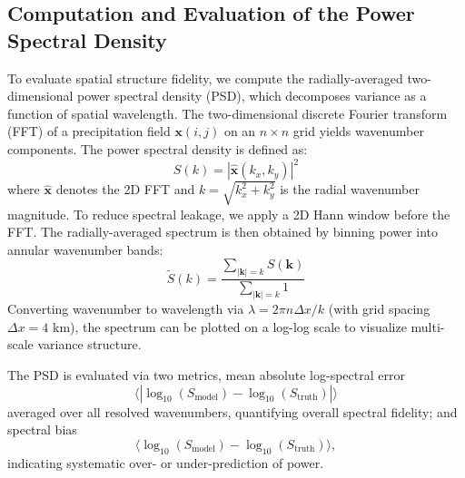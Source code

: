 \documentclass[11pt]{article}
\begin{document}
\subsection{Computation and Evaluation of the Power Spectral Density}
To evaluate spatial structure fidelity, we compute the radially-averaged two-dimensional power spectral density (PSD), which decomposes variance as a function of spatial wavelength.  The two-dimensional discrete Fourier transform (FFT) of a precipitation field $\mathbf{x}(i, j)$ on an $n \times n$ grid yields wavenumber components. The power spectral density is defined as:
$$S(k) = \left|\hat{\mathbf{x}}(k_x, k_y)\right|^2$$
where $\hat{\mathbf{x}}$ denotes the 2D FFT and $k = \sqrt{k_x^2 + k_y^2}$ is the radial wavenumber magnitude. To reduce spectral leakage, we apply a 2D Hann window before the FFT. The radially-averaged spectrum is then obtained by binning power into annular wavenumber bands:
$$
\tilde{S}(k) = \frac{\sum_{|\mathbf{k}| = k} S(\mathbf{k})}{\sum_{|\mathbf{k}| = k} 1}
$$
Converting wavenumber to wavelength via $\lambda = 2\pi n \Delta x / k$ (with grid spacing $\Delta x = 4$ km), the spectrum can be plotted on a log-log scale to visualize multi-scale variance structure.

The PSD is evaluated via two metrics, mean absolute log-spectral error
$$
\langle |\log_{10}(S_{\text{model}}) - \log_{10}(S_{\text{truth}})| \rangle$$
averaged over all resolved wavenumbers, quantifying overall spectral fidelity; and spectral bias
$$\langle \log_{10}(S_{\text{model}}) - \log_{10}(S_{\text{truth}}) \rangle,$$
indicating systematic over- or under-prediction of power.



\end{document}
